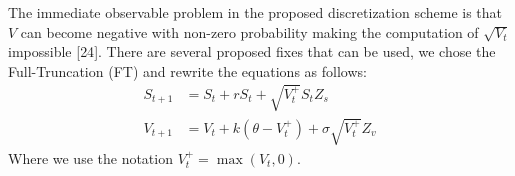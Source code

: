 \documentclass[12pt,twoside]{reedthesis}
\theoremstyle{definition}
\theoremstyle{definition}
\theoremstyle{remark}
\begin{document}
  The immediate observable problem in the proposed discretization scheme
  is that \(V\) can become negative with non-zero probability making the
  computation of \(\sqrt{V_t}\) impossible {[}24{]}. There are several
  proposed fixes that can be used, we chose the Full-Truncation (FT) and
  rewrite the equations as follows:
  \begin{align}
  S_{t+1} &= S_t + rS_t + \sqrt{V_{t}^{+}} S_t Z_s \\
  V_{t+1} &= V_t + k (\theta - V_{t}^{+}) + \sigma \sqrt{V_{t}^{+}} Z_v
  \end{align}
  \noindent
  Where we use the notation \(V_{t}^{+} = \max(V_{t}, 0)\).
  \begin{Shaded}
  \begin{Highlighting}[]
  \StringTok{ } \NormalTok{, }
                           \NormalTok{, }  \NormalTok{)\{}
  
      \NormalTok{(}\NormalTok{)}
  
      \NormalTok{(}\StringTok{ }\OperatorTok{-}\OperatorTok{/}\NormalTok{\}}
  
  \StringTok{ }
  \StringTok{ }
  \StringTok{ }
  
       
  \StringTok{ }
  \StringTok{ }
  \StringTok{ }\OperatorTok{*}\StringTok{ }\OperatorTok{+}\StringTok{ }\NormalTok{(}\NormalTok{(} \OperatorTok{-}\StringTok{ }\OperatorTok{^}\NormalTok{)) }\OperatorTok{*}\StringTok{ }
  
  
  \StringTok{ }
  \NormalTok{        aux[v }\OperatorTok{<}\StringTok{ }\NormalTok{] <-}\StringTok{ }
  \StringTok{ }
  \StringTok{ }\OperatorTok{*}\StringTok{ }\NormalTok{(} \OperatorTok{+}\StringTok{ }\OperatorTok{*}\StringTok{ }\OperatorTok{+}\StringTok{ }\OperatorTok{*}\StringTok{ }\OperatorTok{*}\StringTok{ }
  \NormalTok{        S[S }\OperatorTok{<=}\StringTok{ }\NormalTok{] =}\StringTok{ }
  

\end{Highlighting}
\end{Shaded}
\end{document}
